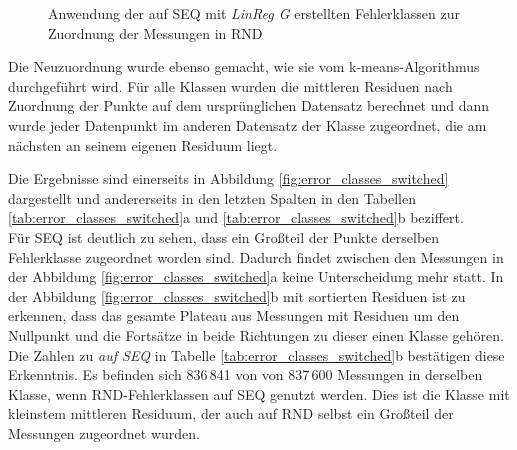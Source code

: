 \documentclass[
	twoside,
	12pt,
	a4paper,
	BCOR10mm,
	DIV14,
	listof=totoc,
	bibliography=totoc,
	headsepline
]{scrreprt}
\begin{document}
\begin{figure}
	\begin{center}
		\caption{Anwendung der auf SEQ mit \textit{LinReg G} erstellten Fehlerklassen zur Zuordnung der Messungen in RND}
		\label{fig:switched_classificators}
	\end{center}
\end{figure} 

Die Neuzuordnung wurde ebenso gemacht, wie sie vom k-means-Algorithmus durchgeführt wird.
Für alle Klassen wurden die mittleren Residuen nach Zuordnung der Punkte auf dem ursprünglichen Datensatz berechnet und dann wurde jeder Datenpunkt im anderen Datensatz der Klasse zugeordnet, die am nächsten an seinem eigenen Residuum liegt.\medskip

Die Ergebnisse sind einerseits in Abbildung \ref{fig:error_classes_switched} dargestellt und andererseits in den letzten Spalten in den Tabellen \ref{tab:error_classes_switched}a und \ref{tab:error_classes_switched}b beziffert.\\
Für SEQ ist deutlich zu sehen, dass ein Großteil der Punkte derselben Fehlerklasse zugeordnet worden sind. Dadurch findet zwischen den Messungen in der Abbildung \ref{fig:error_classes_switched}a keine Unterscheidung mehr statt.
In der Abbildung \ref{fig:error_classes_switched}b mit sortierten Residuen ist zu erkennen, dass das gesamte Plateau aus Messungen mit Residuen um den Nullpunkt und die Fortsätze in beide Richtungen zu dieser einen Klasse gehören.
Die Zahlen zu \textit{auf SEQ} in Tabelle \ref{tab:error_classes_switched}b bestätigen diese Erkenntnis.
Es befinden sich 836\,841 von von 837\,600 Messungen in derselben Klasse, wenn RND-Fehlerklassen auf SEQ genutzt werden.
Dies ist die Klasse mit kleinstem mittleren Residuum, der auch auf RND selbst ein Großteil der Messungen zugeordnet wurden.\medskip
\end{document}
